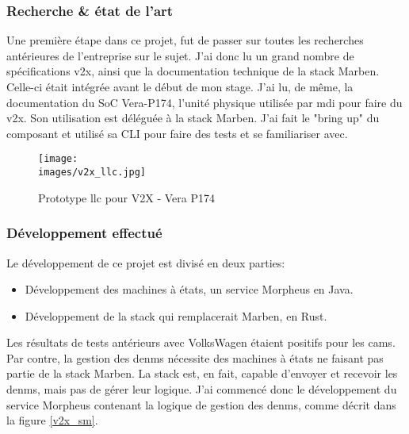         \subsubsection{Recherche \& état de l'art}
            Une première étape dans ce projet, fut de passer sur toutes les recherches
            antérieures de l'entreprise sur le sujet. J'ai donc lu un grand nombre de spécifications
            \gls{v2x}, ainsi que la documentation technique de la stack Marben. Celle-ci
            était intégrée avant le début de mon stage. J'ai lu, de même, la documentation du
            SoC Vera-P174\cite{vera_doc}, l'unité physique utilisée
            par \gls{mdi} pour faire du \gls{v2x}. Son utilisation est déléguée
            à la stack Marben. J'ai fait le "bring up" du composant et utilisé sa CLI pour
            faire des tests et se familiariser avec.

            \begin{figure}[ht]
                \centering
                \texttt{[image: \\images/v2x\_llc.jpg]}
                \caption{Prototype llc pour V2X - Vera P174}
            \end{figure}

        \pagebreak

        \subsubsection{Développement effectué}
            Le développement de ce projet est divisé en deux parties:
            \begin{itemize}
                \renewcommand{\labelitemi}{$\bullet$}
                \item Développement des machines à états, un service Morpheus en Java.
                \item Développement de la stack qui remplacerait Marben, en Rust.
            \end{itemize}
            \bigskip
            Les résultats de tests antérieurs avec VolksWagen étaient positifs pour les
            \gls{cam}s. Par contre, la gestion des \gls{denm}s nécessite des machines
            à états ne faisant pas partie de la stack Marben. La stack est, en fait,
            capable d'envoyer et recevoir les \gls{denm}s, mais pas de gérer leur logique.
            J'ai commencé donc le développement du service Morpheus contenant la logique de
            gestion des \gls{denm}s, comme décrit dans la figure \ref{v2x_sm}.


